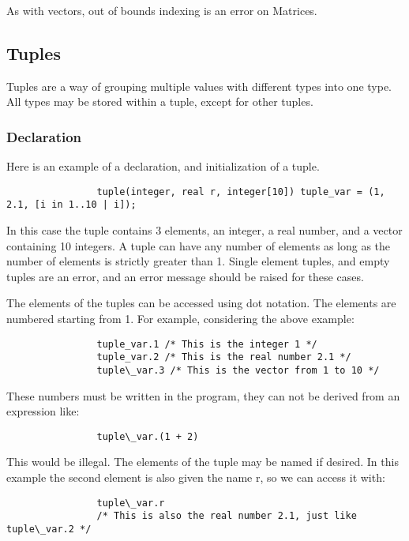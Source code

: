 \documentclass[../../gazprea.tex]{subfiles}
\begin{document}
			As with vectors, out of bounds indexing is an error on Matrices.


	\subsection{Tuples}\label{sec:tuple}

		Tuples are a way of grouping multiple values with different types into one type. All types may be stored within
		a tuple, except for other tuples.

		\subsubsection{Declaration}

			Here is an example of a declaration, and initialization of a tuple.

			\begin{lstlisting}
				tuple(integer, real r, integer[10]) tuple_var = (1, 2.1, [i in 1..10 | i]);
			\end{lstlisting}

			In this case the tuple contains 3 elements, an integer, a real number, and a vector containing 10 integers.
			A tuple can have any number of elements as long as the number of elements is strictly greater than 1. Single
			element tuples, and empty tuples are an error, and an error message should be raised for these cases.

			The elements of the tuples can be accessed using dot notation. The elements are numbered starting from 1.
			For example, considering the above example:

			\begin{lstlisting}
				tuple_var.1 /* This is the integer 1 */
				tuple_var.2 /* This is the real number 2.1 */
				tuple\_var.3 /* This is the vector from 1 to 10 */
			\end{lstlisting}

			These numbers must be written in the program, they can not be derived from an expression like:

			\begin{lstlisting}
				tuple\_var.(1 + 2)
			\end{lstlisting}

			This would be illegal. The elements of the tuple may be named if desired. In this example the second element
			is also given the name r, so we can access it with:

			\begin{lstlisting}
				tuple\_var.r
				/* This is also the real number 2.1, just like tuple\_var.2 */
			\end{lstlisting}
\end{document}
